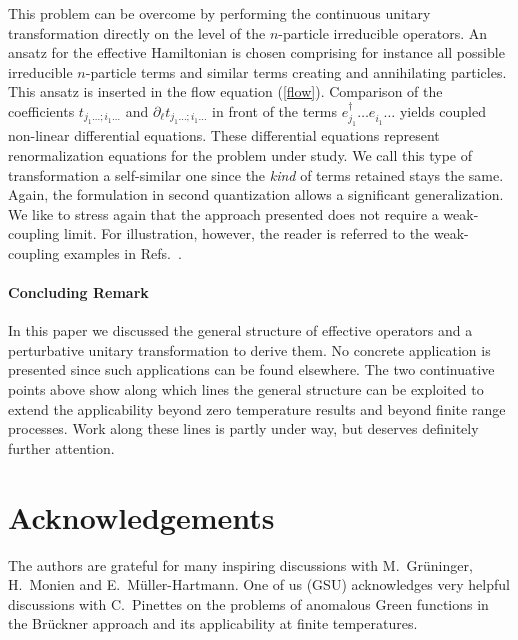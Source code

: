 This problem can be overcome by performing the continuous unitary 
transformation directly on the level of the $n$-particle irreducible
operators.  An ansatz for the effective
Hamiltonian is chosen comprising for instance all possible irreducible
$n$-particle terms and similar terms creating and annihilating particles.
This ansatz is inserted in the flow equation (\ref{flow}). Comparison of
 the coefficients $t_{j_1\ldots;i_1\ldots}$ and 
$\partial_\ell t_{j_1\ldots;i_1\ldots}$ in front of the 
terms $e^\dagger_{j_1}\ldots e^{\phantom{\dagger}}_{i_1}\ldots$
yields coupled non-linear differential equations. 
These differential equations represent renormalization equations
for the problem under study.  We call this type of transformation a 
self-similar one since the {\it kind} of terms retained stays the same.
Again, the formulation in second quantization
allows a significant generalization. We like to stress again
that the approach presented does not require a weak-coupling limit.
For illustration, however, the reader is referred to the 
 weak-coupling examples in  Refs.~. 

\paragraph{Concluding Remark}
In this paper we discussed the general structure of effective operators
and a perturbative unitary transformation to derive them.
No concrete application is presented since such applications can be found
elsewhere. The two continuative points above show along which lines
the general structure can be exploited to extend the applicability
beyond zero temperature results and beyond finite range processes.
Work along these lines is partly under way, but deserves definitely
further attention.


\section{Acknowledgements}
The authors are grateful for many inspiring discussions with
M.~Gr\"uninger, H.~Monien and E.~M\"uller-Hartmann. One of us (GSU)
 acknowledges very helpful discussions with C.~Pinettes on the
problems of anomalous Green functions in the Br\"uckner approach
and its applicability at finite temperatures.

\appendix
